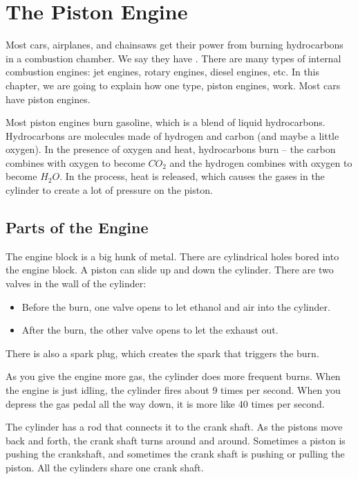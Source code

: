 \chapter{The Piston Engine}

Most cars,  airplanes,  and chainsaws get their power from burning hydrocarbons in a 
combustion chamber.   We say they have .   There are many types of internal combustion engines: jet engines, rotary engines, diesel engines, etc.  In this chapter, we are 
going to explain how one type,  piston engines, work.   Most cars have piston engines.

Most piston engines burn gasoline,  which is a blend of liquid hydrocarbons.  Hydrocarbons are molecules made of hydrogen and carbon (and maybe a little oxygen).  In the presence of oxygen and heat,  hydrocarbons burn -- the carbon combines with oxygen to become $CO_2$ and the hydrogen combines with oxygen to become $H_2O$.  In the process,   heat is released,  which causes the gases in the cylinder to create a lot of pressure on the piston.


\section{Parts of the Engine}

The engine block is a big hunk of metal.  There are cylindrical holes bored into the engine block.  A piston can slide up and down the cylinder.  There are two valves in the wall of the cylinder:  
\begin{itemize}
\item Before the burn, one valve opens to let ethanol and air into the cylinder.
\item After the burn,  the other valve opens to let the exhaust out.
\end{itemize}

There is also a spark plug,   which creates the spark that triggers the burn.

As you give the engine more gas,  the cylinder does more frequent burns.  When the engine is just idling,  the cylinder fires about 9 times per second.  When you depress the gas pedal all the way down,  it is more like 40 times per second.

The cylinder has a rod that connects it to the crank shaft.   As the pistons move back and forth,  the crank shaft turns around and around.  Sometimes a piston is pushing the crankshaft, and sometimes the crank shaft is pushing or pulling the piston.  All the cylinders share one crank shaft.

